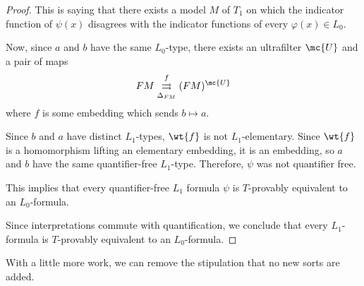 \begin{proof}
This is saying that there exists a model \(M\) of \(T_1\) on which the indicator function of \(\psi(x)\) disagrees with the indicator functions of every \(\varphi(x) \in L_0\).

Now, since \(a\) and \(b\) have the same \(L_0\)-type, there exists an ultrafilter \(\mc{U}\) and a pair of maps
$$
F M \overset{f}{\underset{\Delta_{F M}}{\rightrightarrows}} (F M)^{\mc{U}}
$$
where \(f\) is some embedding which sends \(b \mapsto a\).

Since \(b\) and \(a\) have distinct \(L_1\)-types, $\wt{f}$ is not \(L_1\)-elementary. Since $\wt{f}$ is a homomorphism lifting an elementary embedding, it is an embedding, so $a$ and $b$ have the same quantifier-free $L_1$-type. Therefore, $\psi$ was not quantifier free.

This implies that every quantifier-free $L_1$ formula $\psi$ is $T$-provably equivalent to an $L_0$-formula.

Since interpretations commute with quantification, we conclude that every $L_1$-formula is $T$-provably equivalent to an $L_0$-formula.
  \end{proof}

With a little more work, we can remove the stipulation that no new sorts are added.
  
